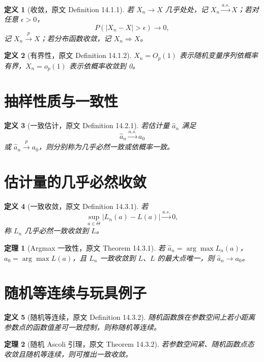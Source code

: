 \documentclass[11pt,a4paper,openany]{ctexbook}
\newtheorem{definition}{定义}[section]
\newtheorem{theorem}{定理}[section]
\begin{document}
\begin{definition}[收敛，原文 Definition 14.1.1]
若 \(X_n\to X\) 几乎处处，记 \(X_n\xrightarrow{a.s.}X\)；若对任意 \(\epsilon>0\)，
\[
  P(|X_n-X|>\epsilon)\to0,
\]
记 \(X_n\xrightarrow{p}X\)；若分布函数收敛，记 \(X_n\Rightarrow X\)。
\end{definition}

\begin{definition}[有界性，原文 Definition 14.1.2]
\(X_n=O_p(1)\) 表示随机变量序列依概率有界，\(X_n=o_p(1)\) 表示依概率收敛到 0。
\end{definition}

\section{抽样性质与一致性}

\begin{definition}[一致估计，原文 Definition 14.2.1]
若估计量 \(\hat a_n\) 满足
\[
  \hat a_n\xrightarrow{a.s.}a_0
\]
或 \(\hat a_n\xrightarrow{p}a_0\)，则分别称为几乎必然一致或依概率一致。
\end{definition}

\section{估计量的几乎必然收敛}

\begin{definition}[一致收敛，原文 Definition 14.3.1]
若
\[
  \sup_{a\in\Theta}|L_n(a)-L(a)|\xrightarrow{a.s.}0,
\]
称 \(L_n\) 几乎必然一致收敛到 \(L\)。
\end{definition}

\begin{theorem}[Argmax 一致性，原文 Theorem 14.3.1]
若 \(\hat a_n=\arg\max L_n(a)\)，\(a_0=\arg\max L(a)\)，且 \(L_n\) 一致收敛到 \(L\)、\(L\) 的最大点唯一，则 \(\hat a_n\to a_0\)。
\end{theorem}

\section{随机等连续与玩具例子}

\begin{definition}[随机等连续，原文 Definition 14.3.2]
随机函数族在参数空间上若小距离参数点的函数值差可一致控制，则称随机等连续。
\end{definition}

\begin{theorem}[随机 Ascoli 引理，原文 Theorem 14.3.2]
若参数空间紧、随机函数点态收敛且随机等连续，则可推出一致收敛。
\end{theorem}
\end{document}
